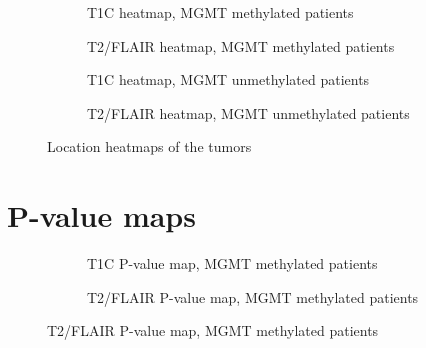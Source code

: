 \begin{subappendices}
\begin{figure}[H]
        \begin{subfigure}[t]{0.4\textwidth}
            \centering
            \caption{\gls{T1C} heatmap, \gls{MGMT} methylated patients}\label{fig:HGG_loc_T1_heatmap_methylated}
        \end{subfigure}
        \begin{subfigure}[t]{0.4\textwidth}
            \centering
            \caption{\gls{T2}/\gls{FLAIR} heatmap, \gls{MGMT} methylated patients}\label{fig:HGG_loc_T2_heatmap_methylated}
        \end{subfigure}

        \begin{subfigure}[t]{0.4\textwidth}
            \centering
            \caption{\gls{T1C} heatmap, \gls{MGMT} unmethylated patients}\label{fig:HGG_loc_T1_heatmap_unmethylated}
        \end{subfigure}
        \begin{subfigure}[t]{0.4\textwidth}
            \centering
            \caption{\gls{T2}/\gls{FLAIR} heatmap, \gls{MGMT} unmethylated patients}\label{fig:HGG_loc_T2_heatmap_unmethylated}
        \end{subfigure}

        \caption{Location heatmaps of the tumors}
    \end{figure}

    \newpage
    \section{P-value maps}
    \begin{figure}[H]
        \centering
        \begin{subfigure}[t]{0.4\textwidth}
            \centering
            \caption{\gls{T1C} P-value map, \gls{MGMT} methylated patients}\label{fig:HGG_loc_T1_p_value_map_methylated}
        \end{subfigure}
        \begin{subfigure}[t]{0.4\textwidth}
            \centering
            \caption{\gls{T2}/\gls{FLAIR} P-value map, \gls{MGMT} methylated patients}\label{fig:HGG_loc_T2_p_value_map_methylated}
        \end{subfigure}


\end{figure}
\end{subappendices}
